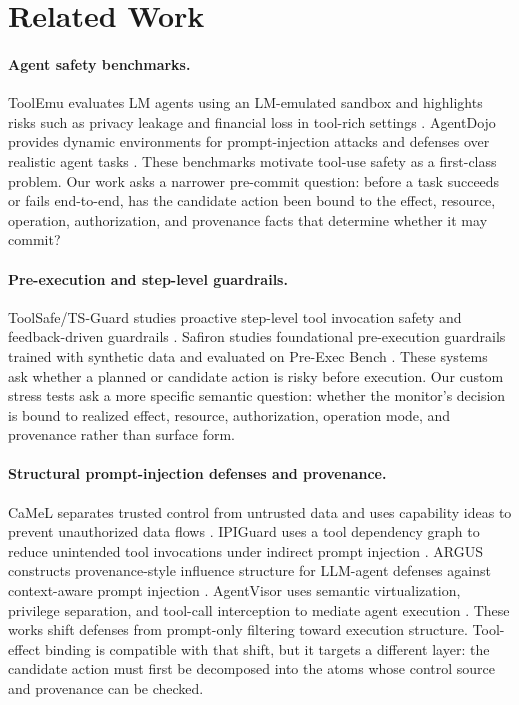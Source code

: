 \section{Related Work}

\paragraph{Agent safety benchmarks.}
ToolEmu evaluates LM agents using an LM-emulated sandbox and highlights risks such as privacy leakage and financial loss in tool-rich settings \cite{toolemu}. AgentDojo provides dynamic environments for prompt-injection attacks and defenses over realistic agent tasks \cite{agentdojo}. These benchmarks motivate tool-use safety as a first-class problem. Our work asks a narrower pre-commit question: before a task succeeds or fails end-to-end, has the candidate action been bound to the effect, resource, operation, authorization, and provenance facts that determine whether it may commit?

\paragraph{Pre-execution and step-level guardrails.}
ToolSafe/TS-Guard studies proactive step-level tool invocation safety and feedback-driven guardrails \cite{toolsafe}. Safiron studies foundational pre-execution guardrails trained with synthetic data and evaluated on Pre-Exec Bench \cite{safiron}. These systems ask whether a planned or candidate action is risky before execution. Our custom stress tests ask a more specific semantic question: whether the monitor's decision is bound to realized effect, resource, authorization, operation mode, and provenance rather than surface form.

\paragraph{Structural prompt-injection defenses and provenance.}
CaMeL separates trusted control from untrusted data and uses capability ideas to prevent unauthorized data flows \cite{camel}. IPIGuard uses a tool dependency graph to reduce unintended tool invocations under indirect prompt injection \cite{ipiguard}. ARGUS constructs provenance-style influence structure for LLM-agent defenses against context-aware prompt injection \cite{weng2026argus}. AgentVisor uses semantic virtualization, privilege separation, and tool-call interception to mediate agent execution \cite{ying2026agentvisor}. These works shift defenses from prompt-only filtering toward execution structure. Tool-effect binding is compatible with that shift, but it targets a different layer: the candidate action must first be decomposed into the atoms whose control source and provenance can be checked.

